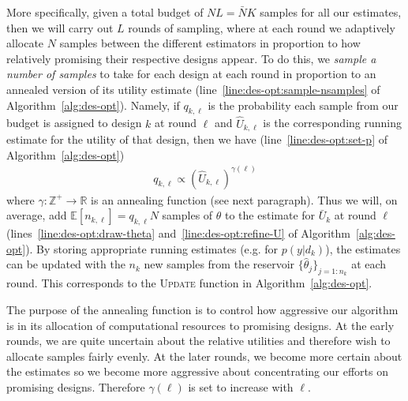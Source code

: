More specifically, given a total budget of $NL=\bar{N}K$ samples for all our estimates,
then we will carry out $L$ rounds of sampling, where at each round we adaptively allocate $N$ samples
between the different estimators in proportion to how relatively promising their respective designs
appear.  To do this,
we \emph{sample a number of samples} to take for each design at each round in proportion to an annealed version of
its utility estimate (line~\ref{line:des-opt:sample-nsamples} of Algorithm~\ref{alg:des-opt}).  
Namely, if $q_{k,\ell}$ is the probability each sample from our budget is assigned
to design $k$ at round $\ell$ and $\hat{U}_{k,\ell}$ is the corresponding running estimate for the utility
of that design, then we have (line~\ref{line:des-opt:set-p} of Algorithm~\ref{alg:des-opt})
\begin{align}
\label{eq:p_k}
q_{k,\ell} \propto (\hat{U}_{k,\ell})^{\gamma(\ell)}
\end{align}
where $\gamma : \mathbb{Z}^+ \rightarrow \mathbb{R}$ is an annealing function (see next paragraph).  
Thus we will, on average,
add $\mathbb{E}[n_{k,\ell}] = q_{k,\ell}N$ samples of $\theta$ to the estimate for $\bar{U}_k$ at round $\ell$
(lines~\ref{line:des-opt:draw-theta} and~\ref{line:des-opt:refine-U} of Algorithm~\ref{alg:des-opt}).
By storing appropriate running estimates (e.g. for $p(y | d_k)$), the estimates can 
be updated with the $n_k$ new samples from the reservoir
$\{\hat{\theta}_j\}_{j=1:n_k}$ at each round.  This corresponds to the \textsc{Update} function in
Algorithm~\ref{alg:des-opt}.

The purpose of the annealing function is to control how aggressive our algorithm is in its allocation of
computational resources to promising designs.
At the early rounds, we are quite uncertain about the relative
utilities and therefore wish to allocate samples fairly evenly.  At the later rounds, we become more certain
about the estimates so we become more aggressive about concentrating our efforts on promising designs.
Therefore $\gamma(\ell)$ is set to increase with $\ell$.


